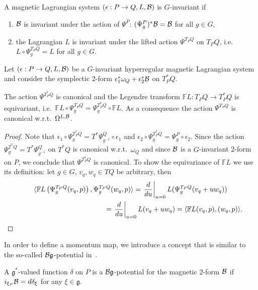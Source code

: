 \documentclass[pdftex]{sigma}
\newcommand{\B}{{\cal B}}
\newcommand{\e}{\epsilon}
\newcommand{\lag}{\mathfrak{g}}
\newcommand{\F}{\mathbb{F}}
\begin{document}
\begin{definition}  A magnetic Lagrangian system $(\e:P\to Q,L,\B)$ is $G$-invariant if
\begin{enumerate}\itemsep=0pt
\item[1)] $\B$ is invariant under the action of $\Psi^P$: $(\Psi^P_g)^*\B = \B$ for all $g\in G$,
\item[2)] the Lagrangian $L$ is invariant under the lifted action $\Psi^{T_PQ}$ on $T_PQ$, i.e.\ $L\circ \Psi^{T_PQ}_g = L$ for all $g\in G$.
    \end{enumerate}
\end{definition}



Let  $(\e:P\to Q, L,\B)$ be a $G$-invariant hyperregular magnetic Lagrangian system and consider the symplectic 2-form $\e^*_1\omega_Q +\e^*_2 \B$ on $T^*_PQ$.
\begin{proposition}\label{prop:equivleg} The action $\Psi^{T^*_PQ}$ is canonical and the Legendre transform $\F L: T_PQ\to T_P^*Q$ is equivariant, i.e.\  $\F L \circ \Psi^{T_PQ}_g=\Psi_g^{T^*_PQ}\circ \F L$. As a consequence the action $\Psi^{T_PQ}$ is canonical w.r.t.~$\Omega^{L,\B}$.
\end{proposition}
\begin{proof}
Note that $\e_1 \circ \Psi^{T^*_PQ}_g = T^*\Psi^Q_{g^{-1}}\circ \e_1$ and $\e_2 \circ \Psi^{T^*_PQ}_g = \Psi^P_g\circ \e_2$. Since the action $\Psi^{T^*Q}_g=T^*\Psi^Q_{g^{-1}}$ on $T^*Q$ is canonical w.r.t.\ $\omega_Q$ and since $\B$ is a $G$-invariant 2-form on $P$, we conclude that $\Psi^{T^*_PQ}$ is canonical. To show the equivariance of $\F L$ we use its def\/inition: let $g\in G$, $v_q,w_q\in TQ$ be arbitrary, then
\begin{gather*}
\langle \F L\left(\Psi_g^{T_PQ}(v_q,p)\right) , \Psi_g^{T_PQ} (w_q,p) \rangle  = \left.\frac{d}{du}\right|_{u=0} L( \Psi_g^{T_PQ}(v_q+uw_q))\\
\hphantom{\langle \F L\left(\Psi_g^{T_PQ}(v_q,p)\right) , \Psi_g^{T_PQ} (w_q,p) \rangle}{}
=\left.\frac{d}{du}\right|_{u=0} L(v_q+uw_q) = \langle \F L(v_q,p), (w_q,p)\rangle. \tag*{\qed}
\end{gather*}\renewcommand{\qed}{}
\end{proof}

In order to def\/ine a momentum map, we introduce a concept that is similar to the so-called  $\B\lag$-potential in~\cite{MarsdenHamRed}.

\begin{definition} \label{def:bgpotential}
A $\lag^*$-valued function $\delta$ on $P$ is a $\B\lag$-potential for the magnetic 2-form $\B$ if $i_{\xi_{P}}\B = d\delta_{\xi}$  for any $\xi \in \lag$.
\end{definition}
\end{document}
